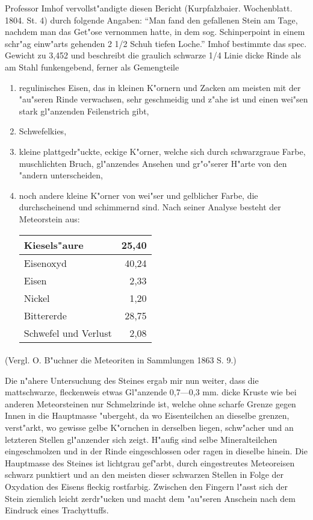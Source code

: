 \documentclass[a4paper, 11pt, oneside]{article}
\begin{document}
Professor Imhof vervollst"andigte diesen Bericht (Kurpfalzbaier. Wochenblatt. 1804. St. 4) durch folgende Angaben: "`Man fand den gefallenen Stein am Tage, nachdem man das Get"ose vernommen hatte, in dem sog. Schinperpoint in einem schr"ag einw"arts gehenden 2 1/2 Schuh tiefen Loche."' Imhof bestimmte das spec. Gewicht zu 3,452 und beschreibt die graulich schwarze 1/4 Linie dicke Rinde als am Stahl funkengebend, ferner als Gemengteile
\begin{enumerate}
    \item regulinisches Eisen, das in kleinen K"ornern und Zacken am meisten mit der "au"seren Rinde verwachsen, sehr geschmeidig und z"ahe ist und einen wei"sen stark gl"anzenden Feilenstrich gibt,
    \item Schwefelkies,
    \item kleine plattgedr"uckte, eckige K"orner, welche sich durch schwarzgraue Farbe, muschlichten Bruch, gl"anzendes Ansehen und gr"o"serer H"arte von den "andern unterscheiden,
    \item noch andere kleine K"orner von wei"ser und gelblicher Farbe, die durchscheinend und schimmernd sind. Nach seiner Analyse besteht der Meteorstein aus:
    \begin{center}
        \begin{tabular}{ |l|r| } 
        \hline
        Kiesels"aure & 25,40\\\hline
        Eisenoxyd & 40,24\\\hline
        Eisen & 2,33\\\hline
        Nickel & 1,20\\\hline
        Bittererde & 28,75\\\hline
        Schwefel und Verlust & 2,08\\
        \hline
        \end{tabular}
    \end{center}
\end{enumerate}
\paragraph{}
(Vergl. O. B"uchner die Meteoriten in Sammlungen 1863 S. 9.)

Die n"ahere Untersuchung des Steines ergab mir nun weiter, dass die mattschwarze, fleckenweis etwas Gl"anzende 0,7---0,3 mm. dicke Kruste wie bei anderen Meteorsteinen nur Schmelzrinde ist, welche ohne scharfe Grenze gegen Innen in die Hauptmasse "ubergeht, da wo Eisenteilchen an dieselbe grenzen, verst"arkt, wo gewisse gelbe K"ornchen in derselben liegen, schw"acher und an letzteren Stellen gl"anzender sich zeigt. H"aufig sind selbe Mineralteilchen eingeschmolzen und in der Rinde eingeschlossen oder ragen in dieselbe hinein. Die Hauptmasse des Steines ist lichtgrau gef"arbt, durch eingestreutes Meteoreisen schwarz punktiert und an den meisten dieser schwarzen Stellen in Folge der Oxydation des Eisens fleckig rostfarbig. Zwischen den Fingern l"asst sich der Stein ziemlich leicht zerdr"ucken und macht dem "au"seren Anschein nach dem Eindruck eines Trachyttuffs.
\end{document}
